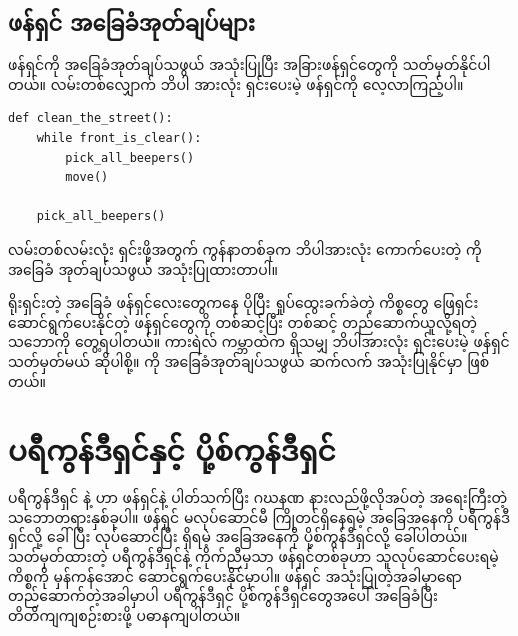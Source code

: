 \subsection*{ဖန်ရှင် အခြေခံအုတ်ချပ်များ}
 ဖန်ရှင်ကို အခြေခံအုတ်ချပ်သဖွယ် အသုံးပြုပြီး အခြားဖန်ရှင်တွေကို သတ်မှတ်နိုင်ပါတယ်။ လမ်းတစ်လျှောက် ဘိပါ အားလုံး ရှင်းပေးမဲ့  ဖန်ရှင်ကို လေ့လာကြည့်ပါ။
%
\setlength{\fboxsep}{0pt}
\begin{verbatim}
def clean_the_street():
    while front_is_clear():
        pick_all_beepers()
        move()

    pick_all_beepers()
\end{verbatim}
%
လမ်းတစ်လမ်းလုံး ရှင်းဖို့အတွက် ကွန်နာတစ်ခုက ဘိပါအားလုံး ကောက်ပေးတဲ့  ကို အခြေခံ အုတ်ချပ်သဖွယ် အသုံးပြုထားတာပါ။ 

ရိုးရှင်းတဲ့ အခြေခံ ဖန်ရှင်လေးတွေကနေ ပိုပြီး ရှုပ်ထွေးခက်ခဲတဲ့ ကိစ္စတွေ ဖြေရှင်း ဆောင်ရွက်ပေးနိုင်တဲ့ ဖန်ရှင်တွေကို တစ်ဆင့်ပြီး တစ်ဆင့် တည်ဆောက်ယူလို့ရတဲ့ သဘောကို တွေ့ရပါတယ်။ ကားရဲလ် ကမ္ဘာထဲက ရှိသမျှ ဘိပါအားလုံး ရှင်းပေးမဲ့  ဖန်ရှင် သတ်မှတ်မယ် ဆိုပါစို့။  ကို အခြေခံအုတ်ချပ်သဖွယ် ဆက်လက် အသုံးပြုနိုင်မှာ ဖြစ်တယ်။ 

\section{ပရီကွန်ဒီရှင်နှင့် ပို့စ်ကွန်ဒီရှင်}
ပရီကွန်ဒီရှင်  နဲ့  ဟာ ဖန်ရှင်နဲ့ ပါတ်သက်ပြီး ဂဃနဏ နားလည်ဖို့လိုအပ်တဲ့ အရေးကြီးတဲ့ သဘောတရားနှစ်ခုပါ။ ဖန်ရှင် မလုပ်ဆောင်မီ ကြိုတင်ရှိနေရမဲ့ အခြေအနေကို  ပရီကွန်ဒီရှင်လို့ ခေါ်ပြီး လုပ်ဆောင်ပြီး ရှိရမဲ့ အခြေအနေကို ပို့စ်ကွန်ဒီရှင်လို့ ခေါ်ပါတယ်။ သတ်မှတ်ထားတဲ့ ပရီကွန်ဒီရှင်နဲ့ ကိုက်ညီမှသာ ဖန်ရှင်တစ်ခုဟာ သူလုပ်ဆောင်ပေးရမဲ့ ကိစ္စကို မှန်ကန်အောင် ဆောင်ရွက်ပေးနိုင်မှာပါ။ ဖန်ရှင် အသုံးပြုတဲ့အခါမှာရော တည်ဆောက်တဲ့အခါမှာပါ ပရီကွန်ဒီရှင် ပို့စ်ကွန်ဒီရှင်တွေအပေါ် အခြေခံပြီး တိတိကျကျစဉ်းစားဖို့ ပဓာနကျပါတယ်။


